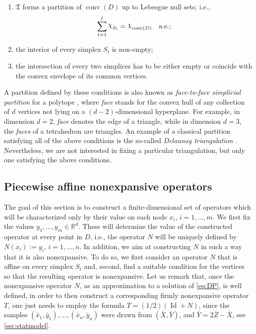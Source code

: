 \documentclass[onefignum,onetabnum]{siamonline250211}
\newcommand{\Id}{\operatorname{Id}}
\newcommand{\R}{\mathbb{R}}
\newcommand{\conv}{\operatorname{conv}}
\newcommand{\bx}{\bar{x}}
\newcommand{\by}{\bar{y}}
\newcommand{\bX}{\bar{X}}
\newcommand{\bY}{\bar{Y}}
\DeclareRobustCommand{\Chi}{{\mathpalette\irchi\relax}}
\newcommand{\irchi}[2]{\raisebox{\depth}{$#1\chi$}} %
\begin{document}
\begin{enumerate}[label=(P\arabic*)]
    \item \label{item:P1} $\mathfrak{T}$ forms a partition of $\conv(D)$ up to Lebesgue null sets; i.e.,
    $$
    \sum_{t=1}^\ell \Chi_{S_t} =\Chi_{\conv(D)} \quad \text{a.e.;}
    $$
    \item \label{item:P2} the interior of every simplex $S_t$ is non-empty;
    \item \label{item:P3} the intersection of every two simplices has to be either empty or coincide with the convex envelope of its common vertices.
\end{enumerate}
A partition defined by these conditions is also known as \emph{face-to-face simplicial partition} for a polytope \cite{hannu2014}, where \textit{face} stands for the convex hull of any collection of $d$ vertices not lying on a $(d-2)$-dimensional hyperplane. For example, in dimension $d=2$, \textit{face} denotes the edge of a triangle, while in dimension $d=3$, the \textit{faces} of a tetrahedron are triangles. An example of a classical partition satisfying all of the above conditions is the so-called \emph{Delaunay triangulation} \cite{fortune}. Nevertheless, we are not interested in fixing a particular triangulation, but only one satisfying the above conditions.

\subsection{Piecewise affine nonexpansive operators}\label{sec:piecewise}
The goal of this section is to construct a finite-dimensional set of operators which will be characterized only by their value on each node $x_i$, $i=1,\dots, m$. We first fix the values $y_1,\ldots,y_m\in \R^d$. These will determine the value of the constructed operator at every point in $D$, i.e., the operator $N$ will be uniquely defined by $N(x_i):=y_i$, $i=1,\ldots, n$. In addition, we aim at constructing $N$ in such a way that it is also nonexpansive. To do so, we first consider an operator $N$ that is affine on every simplex $S_t$ and, second, find a suitable condition for the vertices so that the resulting operator is nonexpansive. Let us remark that, once the nonexpansive operator $N$, as an approximation to a solution of \cref{eq:DP}, is well defined, in order to then construct a corresponding firmly nonexpansive operator $T$, one just needs to employ the formula $T= (1/2)(\Id+N)$, since the samples $(\bx_1, \by_1),\ldots, (\bx_n,\by_n)$ were drawn from $(\bX, \bY)$, and $\bar Y=2\bar Z-\bar X$, see \cref{sec:statmodel}.
\end{document}
